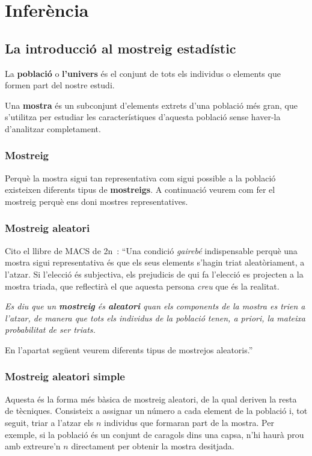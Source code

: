 \section{Inferència}
\subsection{La introducció al mostreig estadístic}
La \textbf{població} o \textbf{l'univers} és el conjunt de tots els individus o elements que formen part del nostre estudi.

Una \textbf{mostra} és un subconjunt d'elements extrets d'una població més gran, que s'utilitza per estudiar les característiques d'aquesta població sense haver-la d'analitzar completament.

\subsubsection{Mostreig}
Perquè la mostra sigui tan representativa com sigui possible a la població existeixen diferents tipus de \textbf{mostreigs}. A continuació veurem com fer el mostreig perquè ens doni mostres representatives.

\subsubsection{Mostreig aleatori}
Cito el llibre de MACS de 2n~\cite{Llibre_MACS_II}:
``Una condició \emph{gairebé} indispensable perquè una mostra sigui representativa és que els seus elements s'hagin triat aleatòriament, a l'atzar. Si l'elecció és subjectiva, els prejudicis de qui fa l'elecció es projecten a la mostra triada, que reflectirà el que aquesta persona \emph{creu} que és la realitat.

\textit{Es diu que un \textbf{mostreig} és \textbf{aleatori} quan els components de la mostra es trien a l'atzar, de manera que tots els individus de la població tenen, a priori, la mateixa probabilitat de ser triats.}

En l'apartat següent veurem diferents tipus de mostrejos aleatoris.''

\subsubsection{Mostreig aleatori simple}
Aquesta és la forma més bàsica de mostreig aleatori, de la qual deriven la resta de tècniques. Consisteix a assignar un número a cada element de la població i, tot seguit, triar a l'atzar els $n$ individus que formaran part de la mostra. Per exemple, si la població és un conjunt de caragols dins una capsa, n'hi haurà prou amb extreure'n $n$ directament per obtenir la mostra desitjada.


